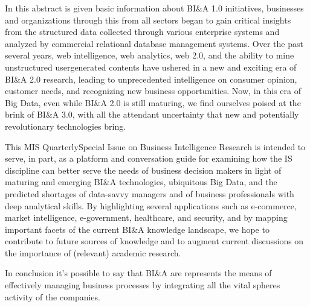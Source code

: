 In this abstract is given basic information about BI\&A 1.0 initiatives, businesses and organizations through this
from all sectors began to gain critical insights from the
structured data collected through various enterprise systems
and analyzed by commercial relational database management
systems. Over the past several years, web intelligence, web
analytics, web 2.0, and the ability to mine unstructured usergenerated contents have ushered in a new and exciting era of
BI\&A 2.0 research, leading to unprecedented intelligence on
consumer opinion, customer needs, and recognizing new
business opportunities. Now, in this era of Big Data, even
while BI\&A 2.0 is still maturing, we find ourselves poised at
the brink of BI\&A 3.0, with all the attendant uncertainty that
new and potentially revolutionary technologies bring.

This MIS QuarterlySpecial Issue on Business Intelligence
Research is intended to serve, in part, as a platform and
conversation guide for examining how the IS discipline can
better serve the needs of business decision makers in light of
maturing and emerging BI\&A technologies, ubiquitous Big
Data, and the predicted shortages of data-savvy managers and
of business professionals with deep analytical skills.
By highlighting several applications such as e-commerce,
market intelligence, e-government, healthcare, and security,
and by mapping important facets of the current BI\&A
knowledge landscape, we hope to contribute to future sources
of knowledge and to augment current discussions on the
importance of (relevant) academic research.

In conclusion it’s possible to say that BI\&A are represents the means of effectively managing business processes by integrating all the vital spheres activity of the companies.